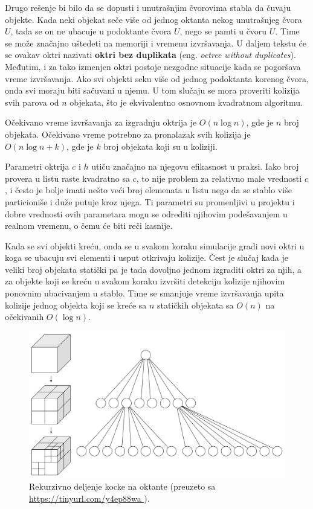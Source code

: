\documentclass[12pt,oneside]{memoir}
\begin{document}
Drugo rešenje bi bilo da se dopusti i unutrašnjim čvorovima stabla da čuvaju objekte.
Kada neki objekat seče više od jednog oktanta nekog unutrašnjeg čvora $U$, tada se on ne ubacuje 
u podoktante čvora $U$, nego se pamti u čvoru $U$. Time se može značajno uštedeti na memoriji i vremenu izvršavanja.
U daljem tekstu će se ovakav oktri nazivati \textbf{oktri bez duplikata} (eng. {\em octree without duplicates}).
Međutim, i za tako izmenjen oktri postoje nezgodne situacije kada se pogoršava vreme izvršavanja.
Ako svi objekti seku više od jednog podoktanta korenog čvora, onda svi moraju biti sačuvani u njemu. 
U tom slučaju se mora proveriti kolizija svih parova od $n$ objekata, što je ekvivalentno osnovnom kvadratnom algoritmu.

Očekivano vreme izvršavanja za izgradnju oktrija je $O(n \log n)$, gde je $n$ broj objekata.
Očekivano vreme potrebno za pronalazak svih kolizija je $O(n \log n + k)$, gde je $k$ broj objekata koji su u koliziji.

Parametri oktrija $c$ i $h$  utiču značajno na njegovu efikasnost u praksi. 
Iako broj provera u listu raste kvadratno sa $c$, to nije problem za relativno male vrednosti $c$, i često je bolje 
imati nešto veći broj elemenata u listu nego da se stablo više particioniše i duže putuje kroz njega.
Ti parametri su promenljivi u projektu i dobre vrednosti ovih parametara mogu se odrediti njihovim podešavanjem u realnom vremenu,
o čemu će biti reči kasnije.

Kada se svi objekti kreću, onda se u svakom koraku simulacije  gradi novi oktri u
koga se ubacuju svi elementi i usput otkrivaju kolizije.
Čest je slučaj kada je veliki broj objekata statički pa je tada dovoljno jednom izgraditi oktri za njih, a za objekte koji se kreću u svakom koraku 
izvršiti detekciju kolizije njihovim ponovnim ubacivanjem u stablo. Time se smanjuje vreme izvršavanja upita 
kolizije jednog objekta koji se kreće sa $n$ statičkih objekata sa $O(n)$ na očekivanih $O(\log n)$.

\begin{figure}[h!]
	\centering
	\includegraphics[scale=0.22]{octree.png}
	\caption{Rekurzivno deljenje kocke na oktante (\tiny preuzeto sa \url{ https://tinyurl.com/y4ep88wa }).}
	
	\label{fig:oct}
\end{figure}
\end{document}
